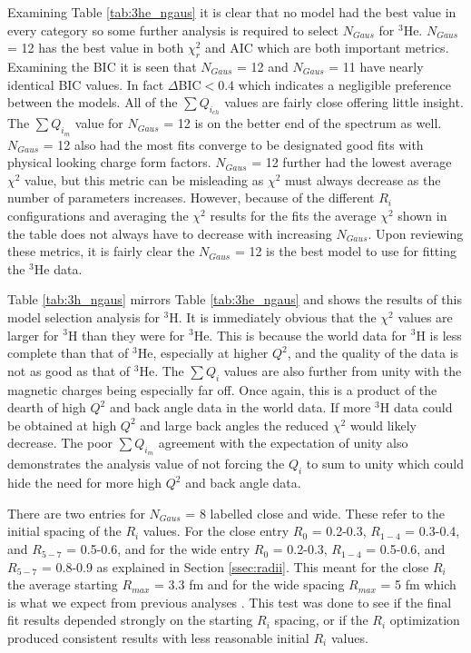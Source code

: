 Examining Table \ref{tab:3he_ngaus} it is clear that no model had the best value in every category so some further analysis is required to select $N_{Gaus}$ for $^3$He. $N_{Gaus}$ = 12 has the best value in both $\chi^2_r$ and AIC which are both important metrics. Examining the BIC it is seen that $N_{Gaus}$ = 12 and $N_{Gaus}$ = 11 have nearly identical BIC values. In fact $\Delta$BIC$<0.4$ which indicates a negligible preference between the models. All of the $\sum Q_{i_{ch}}$ values are fairly close offering little insight. The $\sum Q_{i_{m}}$ value for $N_{Gaus}$ = 12 is on the better end of the spectrum as well. $N_{Gaus}$ = 12 also had the most fits converge to be designated good fits with physical looking charge form factors. $N_{Gaus}$ = 12 further had the lowest average $\chi^2$ value, but this metric can be misleading as $\chi^2$ must always decrease as the number of parameters increases. However, because of the different $R_i$ configurations and averaging the $\chi^2$ results for the fits the average $\chi^2$ shown in the table does not always have to decrease with increasing $N_{Gaus}$. Upon reviewing these metrics, it is fairly clear the $N_{Gaus}$ = 12 is the best model to use for fitting the $^3$He data.

Table \ref{tab:3h_ngaus} mirrors Table \ref{tab:3he_ngaus} and shows the results of this model selection analysis for $^3$H. It is immediately obvious that the $\chi^2$ values are larger for $^3$H than they were for $^3$He. This is because the world data for $^3$H is less complete than that of $^3$He, especially at higher $Q^2$, and the quality of the data is not as good as that of $^3$He. The $\sum Q_i$ values are also further from unity with the magnetic charges being especially far off. Once again, this is a product of the dearth of high $Q^2$ and back angle data in the world data. If more $^3$H data could be obtained at high $Q^2$ and large back angles the reduced $\chi^2$ would likely decrease. The poor $\sum Q_{i_{m}}$ agreement with the expectation of unity also demonstrates the analysis value of not forcing the $Q_i$ to sum to unity which could hide the need for more high $Q^2$ and back angle data.

There are two entries for $N_{Gaus}$ = 8 labelled close and wide. These refer to the initial spacing of the $R_i$ values. For the close entry $R_0$ = 0.2-0.3, $R_{1-4}$ = 0.3-0.4, and $R_{5-7}$ = 0.5-0.6, and for the wide entry $R_0$ = 0.2-0.3, $R_{1-4}$ = 0.5-0.6, and $R_{5-7}$ = 0.8-0.9 as explained in Section \ref{ssec:radii}. This meant for the close $R_i$ the average starting $R_{max}$ = 3.3 fm and for the wide spacing $R_{max}$ = 5 fm which is what we expect from previous analyses \cite{Article:Amroun}. This test was done to see if the final fit results depended strongly on the starting $R_i$ spacing, or if the $R_i$ optimization produced consistent results with less reasonable initial $R_i$ values.

